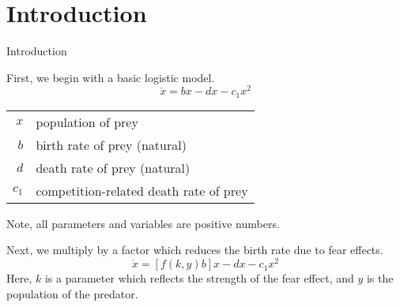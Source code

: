 \documentclass{beamer}
\begin{document}
\section{Introduction}
\begin{frame}{Introduction}

First, we begin with a basic logistic model. 
$$\dot{x}=bx-dx-c_1x^2$$

\begin{center}
\begin{tabular}{rl}
$x$& population of prey\\
$b$& birth rate of prey (natural)\\
$d$& death rate of prey (natural)\\
$c_1$& competition-related death rate of prey\\
\end{tabular} 
\end{center}
Note, all parameters and variables are positive numbers. 
  
%			
%           

\end{frame}
\begin{frame}
Next, we multiply by a factor which reduces the birth rate due to fear effects. 
$$\dot{x}=[f(k,y)b]x-dx-c_1x^2$$
Here, $k$ is a parameter which reflects the strength of the fear effect, and $y$ is the population of the predator.

\end{frame}
\end{document}
